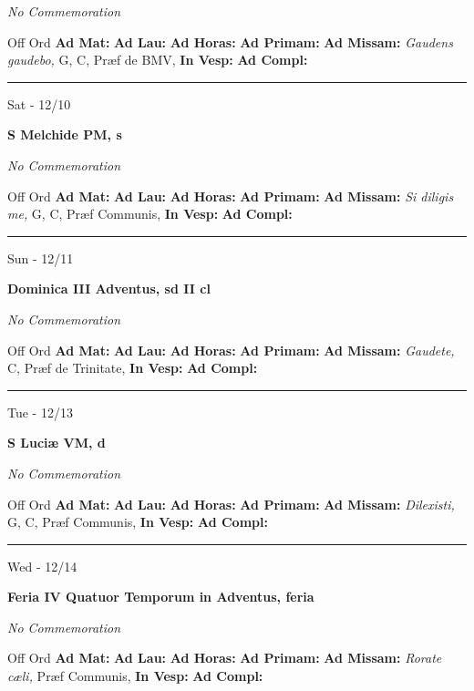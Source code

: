\documentclass[letterpaper, 10pt]{article}
\begin{document}
\textit{No Commemoration}\begin{justify}
Off Ord
\textbf{Ad Mat: }
\textbf{Ad Lau: }
\textbf{Ad Horas: }
\textbf{Ad Primam: }
\textbf{Ad Missam:} \textit{Gaudens gaudebo, } G, C, Præf de BMV, 
\textbf{In Vesp: }
\textbf{Ad Compl: }\end{justify}



\hrule
\begin{center}
Sat - 12/10
\end{center}\textbf{ \large S Melchide PM, \textnormal{\normalsize s}}

\textit{No Commemoration}\begin{justify}
Off Ord
\textbf{Ad Mat: }
\textbf{Ad Lau: }
\textbf{Ad Horas: }
\textbf{Ad Primam: }
\textbf{Ad Missam:} \textit{Si diligis me, } G, C, Præf Communis, 
\textbf{In Vesp: }
\textbf{Ad Compl: }\end{justify}



\hrule
\begin{center}
Sun - 12/11
\end{center}\textbf{ \large Dominica III Adventus, \textnormal{\normalsize sd II cl}}

\textit{No Commemoration}\begin{justify}
Off Ord
\textbf{Ad Mat: }
\textbf{Ad Lau: }
\textbf{Ad Horas: }
\textbf{Ad Primam: }
\textbf{Ad Missam:} \textit{Gaudete, } C, Præf de Trinitate, 
\textbf{In Vesp: }
\textbf{Ad Compl: }\end{justify}



\hrule
\begin{center}
Tue - 12/13
\end{center}\textbf{ \large S Luciæ VM, \textnormal{\normalsize d}}

\textit{No Commemoration}\begin{justify}
Off Ord
\textbf{Ad Mat: }
\textbf{Ad Lau: }
\textbf{Ad Horas: }
\textbf{Ad Primam: }
\textbf{Ad Missam:} \textit{Dilexisti, } G, C, Præf Communis, 
\textbf{In Vesp: }
\textbf{Ad Compl: }\end{justify}



\hrule
\begin{center}
Wed - 12/14
\end{center}\textbf{ \large Feria IV Quatuor Temporum in Adventus, \textnormal{\normalsize feria}}

\textit{No Commemoration}\begin{justify}
Off Ord
\textbf{Ad Mat: }
\textbf{Ad Lau: }
\textbf{Ad Horas: }
\textbf{Ad Primam: }
\textbf{Ad Missam:} \textit{Rorate cæli, } Præf Communis, 
\textbf{In Vesp: }
\textbf{Ad Compl: }\end{justify}
\end{document}
